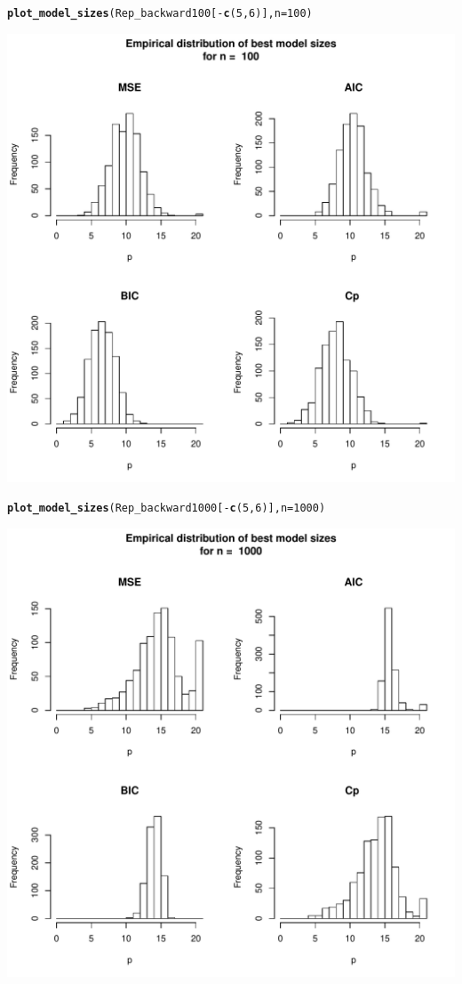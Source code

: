 \documentclass[11pt]{article}\usepackage[]{graphicx}\usepackage[]{color}
\makeatletter
\def\maxwidth{ %
  \ifdim\Gin@nat@width>\linewidth
    \linewidth
  \else
    \Gin@nat@width
  \fi
}
\newcommand{\hlnum}[1]{\textcolor[rgb]{0.686,0.059,0.569}{#1}}%
\newcommand{\hlopt}[1]{\textcolor[rgb]{0,0,0}{#1}}%
\newcommand{\hlstd}[1]{\textcolor[rgb]{0.345,0.345,0.345}{#1}}%
\newcommand{\hlkwc}[1]{\textcolor[rgb]{0.333,0.667,0.333}{#1}}%
\newcommand{\hlkwd}[1]{\textcolor[rgb]{0.737,0.353,0.396}{\textbf{#1}}}%
\newenvironment{kframe}{%
 \def\at@end@of@kframe{}%
 \ifinner\ifhmode%
  \def\at@end@of@kframe{\end{minipage}}%
  \begin{minipage}{\columnwidth}%
 \fi\fi%
 \def\FrameCommand##1{\hskip\@totalleftmargin \hskip-\fboxsep
 \colorbox{shadecolor}{##1}\hskip-\fboxsep
     \hskip-\linewidth \hskip-\@totalleftmargin \hskip\columnwidth}%
 \MakeFramed {\advance\hsize-\width
   \@totalleftmargin\z@ \linewidth\hsize
   \@setminipage}}%
 {\par\unskip\endMakeFramed%
 \at@end@of@kframe}
\newenvironment{knitrout}{}{} %
\makeatother
\begin{document}
\begin{knitrout}
\begin{kframe}
\begin{alltt}
\hlkwd{plot_model_sizes}\hlstd{(Rep_backward100[}\hlopt{-}\hlkwd{c}\hlstd{(}\hlnum{5}\hlstd{,}\hlnum{6}\hlstd{)],}\hlkwc{n}\hlstd{=}\hlnum{100}\hlstd{)}
\end{alltt}
\end{kframe}
\includegraphics[width=\maxwidth]{figure/unnamed-chunk-5-3} 
\begin{kframe}\begin{alltt}
\hlkwd{plot_model_sizes}\hlstd{(Rep_backward1000[}\hlopt{-}\hlkwd{c}\hlstd{(}\hlnum{5}\hlstd{,}\hlnum{6}\hlstd{)],}\hlkwc{n}\hlstd{=}\hlnum{1000}\hlstd{)}
\end{alltt}
\end{kframe}
\includegraphics[width=\maxwidth]{figure/unnamed-chunk-5-4} 

\end{knitrout}
\end{document}
